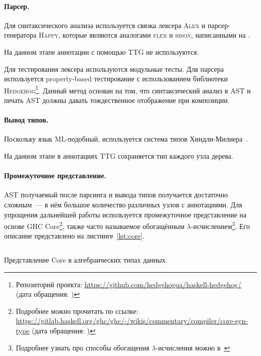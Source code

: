 \paragraph{Парсер.}

Для синтаксического анализа используется связка лексера \textsc{Alex} и парсер-генератора \textsc{Happy}, которые являются аналогами \textsc{flex} и \textsc{bison}, написанными на \Haskell{}.

На данном этапе аннотации с помощью TTG не используются.

Для тестирования лексера используются модульные тесты.
Для парсера используется property-based тестирование с использованием библиотеки \textsc{Hedgehog}\footnote{Репозиторий проекта: \url{https://github.com/hedgehogqa/haskell-hedgehog/} (дата обращения: )}.
Данный метод основан на том, что синтаксический анализ в AST и печать AST должны давать тождественное отображение при композиции.

\paragraph{Вывод типов.}

Поскольку язык ML-подобный, используется система типов Хиндли-Милнера~\cite{hindleyPrincipalTypeSchemeObject1969, milnerTheoryTypePolymorphism1978}.

На данном этапе в аннотациях TTG сохраняется тип каждого узла дерева.

\paragraph{Промежуточное представление.}

AST получаемый после парсинга и вывода типов получается достаточно сложным~--- в нём большое количество различных узлов с аннотациями.
Для упрощения дальнейшей работы используется промежуточное представление на основе GHC Core\footnote{Подробнее можно прочитать по ссылке: \url{https://gitlab.haskell.org/ghc/ghc/-/wikis/commentary/compiler/core-syn-type} (дата обращения: )}, также часто называемое обогащённым $\lambda$-исчислением\footnote{Подробнее узнать про способы обогащения $\lambda$-исчисления можно в~\cite[раздел~3.2]{peytonjones1987the}}.
Его описание представлено на листинге~\ref{lst:core}.

\begin{listing}
    \inputminted[fontsize=\footnotesize]{haskell}{figures/core.hs}
    \caption{Представление Core в алгебраических типах данных.}
    \label{lst:core}
\end{listing}

